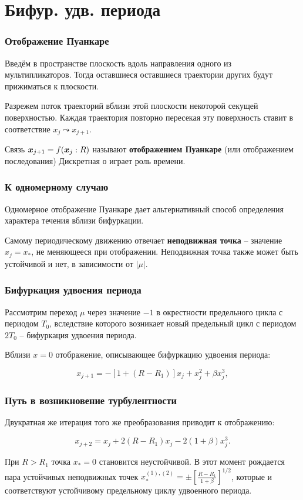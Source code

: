 \section{Бифур. удв. периода}

\begin{frame}
	\frametitle{Отображение Пуанкаре}

	Введём в пространстве плоскость вдоль направления одного из мультипликаторов. Тогда оставшиеся оставшиеся траектории других будут прижиматься к плоскости.

	Разрежем поток траекторий вблизи этой плоскости некоторой секущей поверхностью. Каждая траектория повторно пересекая эту поверхность ставит в соответствие $x_j \leadsto x_{j+1}$.

	Связь $\mbox{\boldmath $x$}_{j+1} = f (\mbox{\boldmath $x$}_j:R)$ называют \textbf{отображением Пуанкаре} (или отображением последования)
	Дискретная о играет роль времени.

\end{frame}

\begin{frame}
	\frametitle{К одномерному случаю}

	Одномерное отображение Пуанкаре дает альтернативный способ определения характера течения вблизи бифуркации. 
	
	\phantom{42}

	Самому периодическому движению отвечает \textbf{неподвижная точка} -- значение $x_j = x_*$, не меняющееся при отображении. Неподвижная точка также может быть устойчивой и нет, в зависимости от $|\mu|$.
\end{frame}

\begin{frame}
	\frametitle{Бифуркация удвоения периода}

	Рассмотрим переход $\mu$ через значение $-1$ в окрестности предельного цикла с периодом $T_0$, вследствие которого возникает новый предельный цикл с периодом $2 T_0$ -- бифуркация удвоения периода.

	\phantom{42}

	Вблизи $x=0$ отображение, описывающее бифуркацию удвоения периода:

	$$x_{j+1} = - [1 + (R - R_1)]x_j + x_j^2 + \beta x_j^3,$$ 
\end{frame}

\begin{frame}
	\frametitle{Путь в возникновение турбулентности}
	Двукратная же итерация того же преобразования приводит к отображению:

$$x_{j+2} = x_j + 2(R-R_1)x_j - 2(1+\beta)x_j^3.$$

При $R>R_1$ точка $x_*=0$ становится неустойчивой.
В этот момент рождается пара устойчивых неподвижных точек $x_*^{(1),(2)} = \pm \left[\frac{R -R_1}{1+\beta}\right]^{1/2}$,
которые и соответствуют устойчивому предельному циклу удвоенного периода.
\end{frame}


